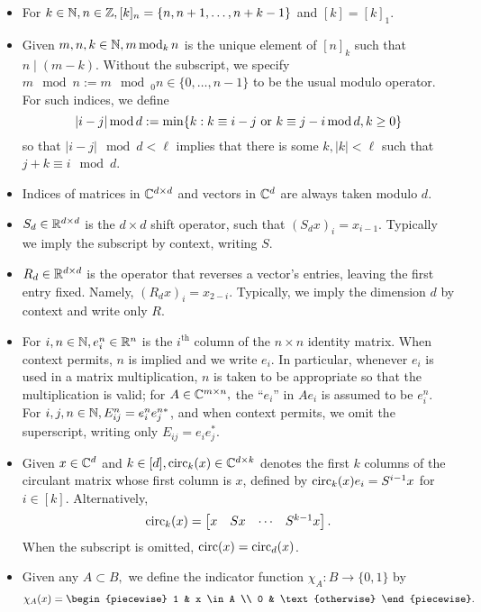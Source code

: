 \begin{itemize}
\item For $k \in \mathbb{N}, n \in \mathbb{Z}, [k]_n = \{n, n + 1, \ldots, n + k - 1\}$ and $[k] = [k]_1$.
\item Given $m, n, k \in \mathbb{N}, m \operatorname{\mathbin{mod}}_k n$ is the unique element of $[n]_k$ such that $n \mid (m - k)$.  Without the subscript, we specify $m \mod n := m \mod_0 n \in \{0, \ldots, n - 1\}$ to be the usual modulo operator.  For such indices, we define \begin{equation} \abs{i - j} \mod d := \min \{k : k \equiv i - j \ \text{or} \ k \equiv j - i \mod d, k \ge 0\} \label{eq:modabs} \end{equation} so that $|i - j| \mod d < \ell$ implies that there is some $k, |k| < \ell$ such that $j + k \equiv i \mod d$.
\item Indices of matrices in $\mathbb{C}^{d \times d}$ and vectors in $\mathbb{C}^d$ are always taken modulo $d$.
\item $S_d \in \mathbb{R}^{d \times d}$ is the $d \times d$ shift operator, such that $(S_d x)_i = x_{i - 1}$.  Typically we imply the subscript by context, writing $S$.
\item $R_d \in \mathbb{R}^{d \times d}$ is the operator that reverses a vector's entries, leaving the first entry fixed.  Namely, $(R_d x)_i = x_{2 - i}$.  Typically, we imply the dimension $d$ by context and write only $R$.
\item For $i, n \in \mathbb{N}, e_i^n \in \mathbb{R}^n$ is the $i^{\text{th}}$ column of the $n \times n$ identity matrix.  When context permits, $n$ is implied and we write $e_i$.  In particular, whenever $e_i$ is used in a matrix multiplication, $n$ is taken to be appropriate so that the multiplication is valid; for $A \in \mathbb{C}^{m \times n},$ the ``$e_i$'' in $A e_i$ is assumed to be $e_i^n$.  For $i, j, n \in \mathbb{N}, E_{ij}^n = e_i^n e_j^{n*}$, and when context permits, we omit the superscript, writing only $E_{ij} = e_i e_j^*$.
\item Given $x \in \mathbb{C}^d$ and $k \in [d], \operatorname{circ}_k(x) \in \mathbb{C}^{d \times k}$ denotes the first $k$ columns of the circulant matrix whose first column is $x$, defined by $\operatorname{circ}_k(x) e_i = S^{i - 1} x$ for $i \in [k]$.  Alternatively, \[\operatorname{circ}_k(x) = \begin{bmatrix} x & S x & \cdots & S^{k-1} x \end{bmatrix}.\]  When the subscript is omitted, $\operatorname{circ}(x) = \operatorname{circ}_d(x)$.
  \item Given any $A \subset B,$ we define the indicator function $\chi_A : B \to \{0, 1\}$ by \[\chi_A(x) = \begin{piecewise} 1 & x \in A \\ 0 & \text{otherwise} \end{piecewise}.\]

\end{itemize}
